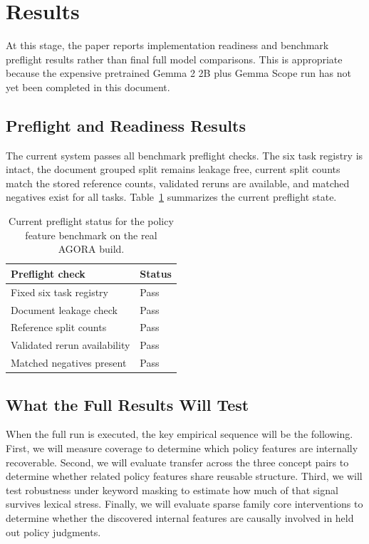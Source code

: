 ﻿\documentclass{article}
\begin{document}
\section{Results}
At this stage, the paper reports implementation readiness and benchmark preflight results rather than final full model comparisons. This is appropriate because the expensive pretrained Gemma 2 2B plus Gemma Scope run has not yet been completed in this document.

\subsection{Preflight and Readiness Results}
The current system passes all benchmark preflight checks. The six task registry is intact, the document grouped split remains leakage free, current split counts match the stored reference counts, validated reruns are available, and matched negatives exist for all tasks. Table~\ref{tab:preflight} summarizes the current preflight state.

\begin{table}[t]
\centering
\small
\begin{tabular}{ll}
\toprule
Preflight check & Status \\
\midrule
Fixed six task registry & Pass \\
Document leakage check & Pass \\
Reference split counts & Pass \\
Validated rerun availability & Pass \\
Matched negatives present & Pass \\
\bottomrule
\end{tabular}
\caption{Current preflight status for the policy feature benchmark on the real AGORA build.}
\label{tab:preflight}
\end{table}

\subsection{What the Full Results Will Test}
When the full run is executed, the key empirical sequence will be the following. First, we will measure coverage to determine which policy features are internally recoverable. Second, we will evaluate transfer across the three concept pairs to determine whether related policy features share reusable structure. Third, we will test robustness under keyword masking to estimate how much of that signal survives lexical stress. Finally, we will evaluate sparse family core interventions to determine whether the discovered internal features are causally involved in held out policy judgments.
\end{document}
